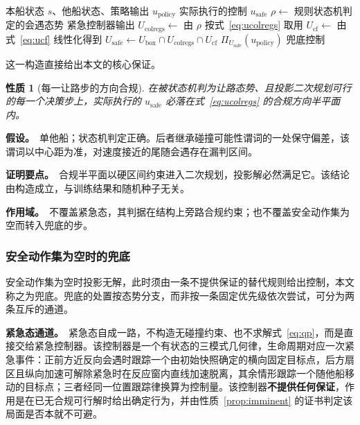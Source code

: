 \documentclass[12pt,letterpaper]{article}
\newtheorem{prop}{性质}
\begin{document}
\begin{algorithm}[htbp]
\caption{投影式安全盾的单步执行}
\label{alg:shield}
\small
\begin{algorithmic}[1]
\Require 本船状态 $s$、他船状态、策略输出 $u_{\mathrm{policy}}$
\Ensure 实际执行的控制 $u_{\mathrm{safe}}$
\State $\rho \gets$ 规则状态机判定的会遇态势
  \State \Return 紧急控制器输出
\EndIf
\State $U_{\mathrm{colregs}} \gets$ 由 $\rho$ 按式~\eqref{eq:ucolregs} 取用
\State $U_{\mathrm{cf}} \gets$ 由式~\eqref{eq:ucf} 线性化得到
\State $U_{\mathrm{safe}} \gets U_{\mathrm{box}}\cap U_{\mathrm{colregs}}\cap U_{\mathrm{cf}}$
  \State \Return $\Pi_{U_{\mathrm{safe}}}(u_{\mathrm{policy}})$
\EndIf
\State \Return 兜底控制
\end{algorithmic}
\end{algorithm}


这一构造直接给出本文的核心保证。
\begin{prop}[每一让路步的方向合规]\label{prop:comply}
在被状态机判为让路态势、且投影二次规划可行的每一个决策步上，实际执行的 $u_{\mathrm{safe}}$ 必落在式~\eqref{eq:ucolregs} 的合规方向半平面内。
\end{prop}

\noindent\textbf{假设。}\ 单他船；状态机判定正确。后者继承碰撞可能性谓词的一处保守偏差，该谓词以中心距为准，对速度接近的尾随会遇存在漏判区间。

\noindent\textbf{证明要点。}\ 合规半平面以硬区间约束进入二次规划，投影解必然满足它。该结论由构造成立，与训练结果和随机种子无关。

\noindent\textbf{作用域。}\ 不覆盖紧急态，其判据在结构上旁路合规约束；也不覆盖安全动作集为空而转入兜底的步。

\subsubsection{安全动作集为空时的兜底}

安全动作集为空时投影无解，此时须由一条不提供保证的替代规则给出控制，本文称之为兜底。兜底的处置按态势分支，而非按一条固定优先级依次尝试，可分为两条互斥的通道。

\textbf{紧急态通道。}\ 紧急态自成一路，不构造无碰撞约束、也不求解式~\eqref{eq:qp}，而是直接交给紧急控制器。该控制器是一个有状态的三模式几何律，生命周期对应一次紧急事件：正前方近反向会遇时跟踪一个由初始快照确定的横向固定目标点，后方扇区且纵向加速可解除紧急时在反应窗内直线加速脱离，其余情形跟踪一个随他船移动的目标点；三者经同一位置跟踪律换算为控制量。该控制器\textbf{不提供任何保证}，作用是在已无合规可行解时给出确定行为，并由性质~\ref{prop:imminent} 的证书判定该局面是否本就不可避。
\end{document}
